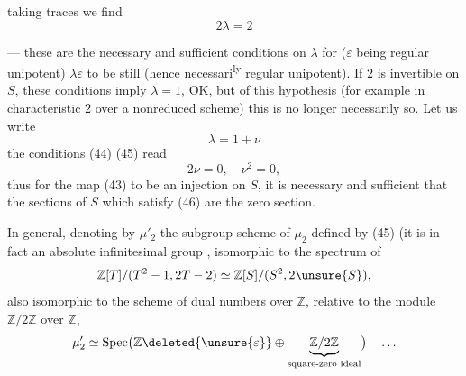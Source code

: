 taking traces we find
\[
  2\lambda=2 \tag{45}
\]

--- these are the necessary and sufficient conditions on $\lambda$ for
\deleted{\unsure{$\lambda$}}
($\varepsilon$ being regular unipotent)
$\lambda\varepsilon$ to be still 
 (hence necessari\textsuperscript{ly} regular unipotent).
If $2$ is invertible on $S$, 
these conditions imply $\lambda=1$, OK, but
 of this hypothesis (for example in characteristic $2$
 over a nonreduced scheme) this is no longer necessarily so. Let us write
\[
  \lambda=1+\nu
\]
the conditions (44) (45) read
\[
  2\nu=0,\quad \nu^2=0, \tag{46}
\]
thus for the map (43) to be an injection on $S$, it is necessary and sufficient
that the  sections of $S$ which satisfy (46)
are the zero section.

In general, denoting by $\mu'_2$ the subgroup scheme
of $\mu_2$ defined by (45)
(it is in fact an absolute infinitesimal group ,
 
isomorphic to the spectrum of
\[
  \mathbb Z[T]/(T^2-1,2T-2)\simeq
  \mathbb Z[S]/(S^2,2\unsure{S}),
\]
also isomorphic to the scheme of dual numbers over $\mathbb Z$,
relative to the module $\mathbb Z/2\mathbb Z$ over $\mathbb Z$,
\[
  \mu'_2\simeq\operatorname{Spec}
  \bigl(\mathbb Z\deleted{\unsure{\varepsilon}}\oplus\underbrace{\mathbb Z/2\mathbb Z}_{\text{square-zero ideal}}\bigr)
  \quad\ldots
\]


